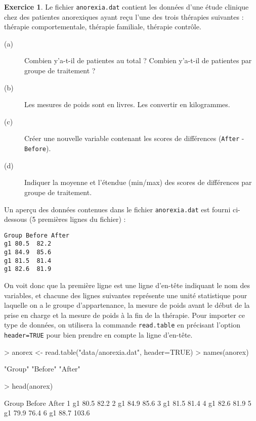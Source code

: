 \documentclass[11pt]{report}
\theoremstyle{definition}
\newtheorem{exo}{Exercice}[chapter]
\begin{document}
\begin{exo}\label{exo:1.5}
Le fichier \texttt{anorexia.dat} contient les données d'une étude clinique
chez des patientes anorexiques ayant reçu l'une des trois thérapies
suivantes : thérapie comportementale, thérapie familiale, thérapie
contrôle.\autocite{hand93} 
\begin{description}
\item[(a)] Combien y'a-t-il de patientes au total ? Combien y'a-t-il de
  patientes par groupe de traitement ?
\item[(b)] Les mesures de poids sont en livres. Les convertir en
  kilogrammes.    
\item[(c)] Créer une nouvelle variable contenant les scores de différences
  (\texttt{After} - \texttt{Before}).
\item[(d)] Indiquer la moyenne et l'étendue (min/max) des scores de
  différences par groupe de traitement.
\end{description}
\begin{sol}
Un aperçu des données contenues dans le fichier \texttt{anorexia.dat} est
fourni ci-dessous (5 premières lignes du fichier) :
\begin{verbatim}
Group Before After
g1 80.5  82.2
g1 84.9  85.6
g1 81.5  81.4
g1 82.6  81.9
\end{verbatim}
On voit donc que la première ligne est une ligne d'en-tête indiquant le nom
des variables, et chacune des lignes suivantes représente une unité
statistique pour laquelle on a le groupe d'appartenance, la mesure de poids
avant le début de la prise en charge et la mesure de poids à la fin de la thérapie.
Pour importer ce type de données, on utilisera la commande
\texttt{read.table} en précisant l'option \verb|header=TRUE| pour bien
prendre en compte la ligne d'en-tête.
\begin{Schunk}
\begin{Sinput}
> anorex <- read.table("data/anorexia.dat", header=TRUE)
> names(anorex)
\end{Sinput}
\begin{Soutput}
[1] "Group"  "Before" "After" 
\end{Soutput}
\begin{Sinput}
> head(anorex)
\end{Sinput}
\begin{Soutput}
  Group Before After
1    g1   80.5  82.2
2    g1   84.9  85.6
3    g1   81.5  81.4
4    g1   82.6  81.9
5    g1   79.9  76.4
6    g1   88.7 103.6
\end{Soutput}
\end{Schunk}

\end{sol}
\end{exo}
\end{document}
